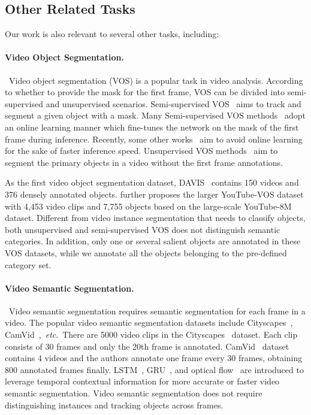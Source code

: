 \documentclass[twocolumn]{svjour3}          \smartqed  \usepackage{graphicx}
\newcommand{\etc}{\textit{etc}.}
\begin{document}
\begin{sloppypar}
\subsection{Other Related Tasks}

Our work is also relevant to several other tasks, including:

\paragraph{Video Object Segmentation.}~Video object segmentation (VOS) is a popular task in video analysis. According to whether to provide the mask for the first frame, VOS can be divided into semi-supervised and unsupervised scenarios. Semi-supervised VOS~\cite{onlinevos_1,onlinevos_2,onlinevos_3,vos1,vos2,vos3,stm,li2020delving,swiftnet} aims to track and segment a given object with a mask. Many Semi-supervised VOS methods~\cite{onlinevos_1,onlinevos_2,onlinevos_3} adopt an online learning manner which fine-tunes the network on the mask of the first frame during inference. Recently, some other works~\cite{vos1,vos2,vos3,stm,li2020delving,swiftnet} aim to avoid online learning for the sake of faster inference speed. Unsupervised VOS methods~\cite{uvos1,uvos2,uvos3} aim to segment the primary objects in a video without the first frame annotations.

As the first video object segmentation dataset, DAVIS~\cite{davis2016,davis2017_unsupervised} contains 150 videos and 376 densely annotated objects. \cite{youtube_vos} further proposes the larger YouTube-VOS dataset with 4,453 video clips and 7,755 objects based on the large-scale YouTube-8M~\cite{youtube-8m} dataset.
Different from video instance segmentation that needs to classify objects, both unsupervised and semi-supervised VOS does not distinguish semantic categories. In addition, only one or several salient objects are annotated in these VOS datasets, while we annotate all the objects belonging to the pre-defined category set.

\paragraph{Video Semantic Segmentation.}~Video semantic segmentation requires semantic segmentation for each frame in a video. The popular video semantic segmentation datasets include Cityscapes~\cite{cityscapes}, CamVid~\cite{camvid},~\etc~There are 5000 video clips in the Cityscapes~\cite{cityscapes} dataset. Each clip consists of 30 frames and only the 20th frame is annotated. CamVid~\cite{camvid} dataset contains 4 videos and the authors annotate one frame every 30 frames, obtaining 800 annotated frames finally.
LSTM~\cite{vss_lstm}, GRU~\cite{vss_gru}, and optical flow~\cite{deep_feature_flow} are introduced to leverage temporal contextual information for more accurate or faster video semantic segmentation. Video semantic segmentation does not require distinguishing instances and tracking objects across frames.


\end{sloppypar}
\end{document}
